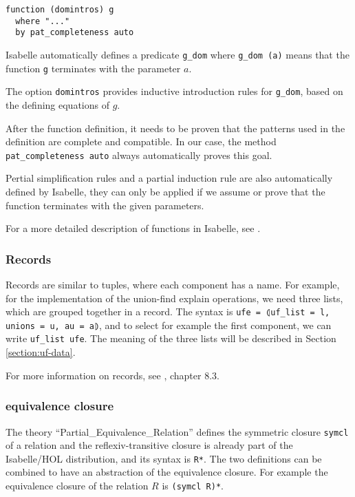\begin{lstlisting}
function (domintros) g
  where "..."
  by pat_completeness auto
\end{lstlisting}

Isabelle automatically defines a predicate \lstinline|g_dom| where \lstinline{g_dom (a)} means that the function \lstinline|g| terminates with the parameter $a$.

The option \lstinline{domintros} provides inductive introduction rules for \lstinline|g_dom|, based on the defining equations of $g$.

After the function definition, it needs to be proven that the patterns used in the definition are complete and compatible. In our case, the method \lstinline|pat_completeness auto| always automatically proves this goal.

Pertial simplification rules and a partial induction rule are also automatically defined by Isabelle, they can only be applied if we assume or prove that the function terminates with the given parameters.

For a more detailed description of functions in Isabelle, see \cite{functions}.

\subsubsection{Records}

Records are similar to tuples, where each component has a name. For example, for the implementation of the union-find explain operations, we need three lists, which are grouped together in a record. The syntax is \lstinline{ufe = ⦇uf_list = l, unions = u, au = a⦈}, and to select for example the first component, we can write \lstinline{uf_list ufe}. The meaning of the three lists will be described in Section \ref{section:uf-data}.

For more information on records, see \cite{isabelle}, chapter 8.3.

\subsubsection{equivalence closure}

The theory ``Partial\_Equivalence\_Relation''\cite{Collections-AFP} defines the symmetric closure \lstinline{symcl} of a relation and the reflexiv-transitive closure is already part of the Isabelle/HOL distribution, and its syntax is \lstinline{R*}. The two definitions can be combined to have an abstraction of the equivalence closure. For example the equivalence closure of the relation $R$ is \lstinline{(symcl R)*}.


